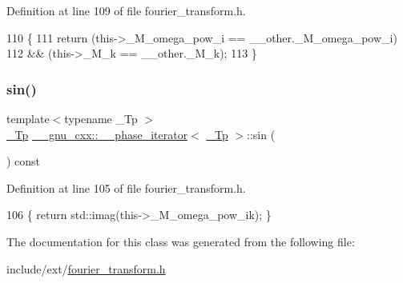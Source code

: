 Definition at line 109 of file fourier\+\_\+transform.\+h.


\begin{DoxyCode}
110       \{
111         \textcolor{keywordflow}{return} (this->\_M\_omega\_pow\_i == \_\_other.\_M\_omega\_pow\_i)
112             && (this->\_M\_k == \_\_other.\_M\_k);
113       \}
\end{DoxyCode}
\mbox{\label{class____gnu__cxx_1_1____phase__iterator_aaf464df540423bc4d451ca55a93bd9d7}} 
\subsubsection{\texorpdfstring{sin()}{sin()}}
{\footnotesize\ttfamily template$<$typename \+\_\+\+Tp $>$ \\
\hyperlink{namespace____gnu__cxx_a3b19a9c800ca194374ef9172290f7d79}{\+\_\+\+Tp} \hyperlink{class____gnu__cxx_1_1____phase__iterator}{\+\_\+\+\_\+gnu\+\_\+cxx\+::\+\_\+\+\_\+phase\+\_\+iterator}$<$ \hyperlink{namespace____gnu__cxx_a3b19a9c800ca194374ef9172290f7d79}{\+\_\+\+Tp} $>$\+::sin (\begin{DoxyParamCaption}{ }\end{DoxyParamCaption}) const\hspace{0.3cm}{\ttfamily [inline]}}



Definition at line 105 of file fourier\+\_\+transform.\+h.


\begin{DoxyCode}
106       \{ \textcolor{keywordflow}{return} std::imag(this->\_M\_omega\_pow\_ik); \}
\end{DoxyCode}


The documentation for this class was generated from the following file\+:\begin{DoxyCompactItemize}
\item 
include/ext/\hyperlink{fourier__transform_8h}{fourier\+\_\+transform.\+h}\end{DoxyCompactItemize}
